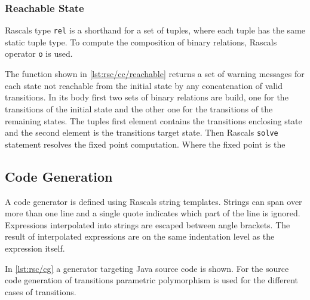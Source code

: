 

\subsubsection{Reachable State}

Rascals type \lstinline[language=rascal]{rel} is a shorthand for a set of tuples, where each tuple has the same static tuple type.
To compute the composition of binary relations, Rascals operator \lstinline[language=rascal]{o} is used.

The function shown in \autoref{lst:rsc/cc/reachable} returns a set of warning messages for each state not reachable from the initial state by any concatenation of valid transitions.
In its body first two sets of binary relations are build, one for the transitions of the initial state and the other one for the transitions of the remaining states.
The tuples first element contains the transitions enclosing state and the second element is the transitions target state.
Then Rascals \lstinline[language=rascal]{solve} statement resolves the fixed point computation.
Where the fixed point is the 



\subsection{Code Generation}
\label{ss:rsc/cg}

A code generator is defined using Rascals string templates.
Strings can span over more than one line and a single quote indicates which part of the line is ignored.
Expressions interpolated into strings are escaped between angle brackets.
The result of interpolated expressions are on the same indentation level as the expression itself.

In \autoref{lst:rsc/cg} a generator targeting Java source code is shown. For the source code generation of transitions parametric polymorphism is used for the different cases of transitions.



